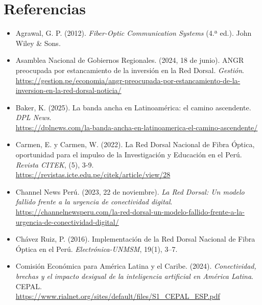 \section*{Referencias}

\begin{itemize}[leftmargin=1.27cm, itemindent=-1.27cm, label={}, itemsep=12pt, parsep=0pt]
\raggedright

\item Agrawal, G. P. (2012). \textit{Fiber-Optic Communication Systems} (4.ª ed.). John Wiley \& Sons.\\

\item Asamblea Nacional de Gobiernos Regionales. (2024, 18 de junio). ANGR preocupada por estancamiento de la inversión en la Red Dorsal. \textit{Gestión}.\\
\url{https://gestion.pe/economia/angr-preocupada-por-estancamiento-de-la-inversion-en-la-red-dorsal-noticia/}

\item Baker, K. (2025). La banda ancha en Latinoamérica: el camino ascendente. \textit{DPL News}.\\
\url{https://dplnews.com/la-banda-ancha-en-latinoamerica-el-camino-ascendente/}

\item Carmen, E. y Carmen, W. (2022). La Red Dorsal Nacional de Fibra Óptica, oportunidad para el impulso de la Investigación y Educación en el Perú. \textit{Revista CITEK}, (5), 3-9.\\
\url{https://revistas.icte.edu.pe/citek/article/view/28}

\item Channel News Perú. (2023, 22 de noviembre). \textit{La Red Dorsal: Un modelo fallido frente a la urgencia de conectividad digital}.\\
\url{https://channelnewsperu.com/la-red-dorsal-un-modelo-fallido-frente-a-la-urgencia-de-conectividad-digital/}

\item Chávez Ruiz, P. (2016). Implementación de la Red Dorsal Nacional de Fibra Óptica en el Perú. \textit{Electrónica-UNMSM}, 19(1), 3–7.\\

\item Comisión Económica para América Latina y el Caribe. (2024). \textit{Conectividad, brechas y el impacto desigual de la inteligencia artificial en América Latina}. CEPAL.\\
\url{https://www.rialnet.org/sites/default/files/S1_CEPAL_ESP.pdf}


\end{itemize}

